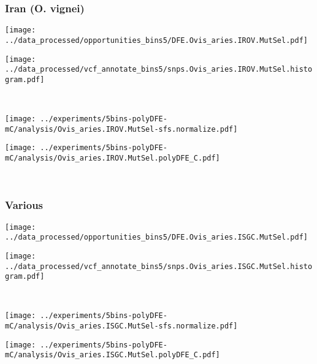 \subsubsection{Iran (O. vignei)}

\begin{minipage}{0.49\linewidth}
    \texttt{[image: ../data\_processed/opportunities\_bins5/DFE.Ovis\_aries.IROV.MutSel.pdf]}
\end{minipage}
\begin{minipage}{0.49\linewidth}
    \texttt{[image: ../data\_processed/vcf\_annotate\_bins5/snps.Ovis\_aries.IROV.MutSel.histogram.pdf]}
\end{minipage}
\\
\begin{minipage}{0.49\linewidth}
    \texttt{[image: ../experiments/5bins-polyDFE-mC/analysis/Ovis\_aries.IROV.MutSel-sfs.normalize.pdf]}
\end{minipage}
\begin{minipage}{0.49\linewidth}
    \texttt{[image: ../experiments/5bins-polyDFE-mC/analysis/Ovis\_aries.IROV.MutSel.polyDFE\_C.pdf]}
\end{minipage}
\\

\subsubsection{Various}

\begin{minipage}{0.49\linewidth}
    \texttt{[image: ../data\_processed/opportunities\_bins5/DFE.Ovis\_aries.ISGC.MutSel.pdf]}
\end{minipage}
\begin{minipage}{0.49\linewidth}
    \texttt{[image: ../data\_processed/vcf\_annotate\_bins5/snps.Ovis\_aries.ISGC.MutSel.histogram.pdf]}
\end{minipage}
\\
\begin{minipage}{0.49\linewidth}
    \texttt{[image: ../experiments/5bins-polyDFE-mC/analysis/Ovis\_aries.ISGC.MutSel-sfs.normalize.pdf]}
\end{minipage}
\begin{minipage}{0.49\linewidth}
    \texttt{[image: ../experiments/5bins-polyDFE-mC/analysis/Ovis\_aries.ISGC.MutSel.polyDFE\_C.pdf]}
\end{minipage}
\\

